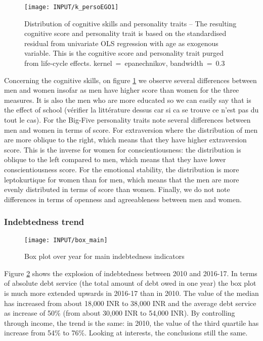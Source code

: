 \documentclass[a4paper, 11pt, onecolumn]{article}
\begin{document}
\begin{figure}[ht]
\raggedright
\texttt{[image: INPUT/k\_persoEGO1]}
\caption{Distribution of cognitive skills and personality traits -- The resulting cognitive score and personality trait is based on the standardised residual from univariate OLS regression with age as exogenous variable. This is the cognitive score and personality trait purged from life-cycle effects. kernel~=~epanechnikov, bandwidth~=~0.3}
\label{figure:EGOscore}
\end{figure}
Concerning the cognitive skills, on figure \ref{figure:EGOscore} we observe several differences between men and women insofar as men have higher score than women for the three measures.
It is also the men who are more educated so we can easily say that is the effect of school (vérifier la littérature dessus car si ca se trouve ce n'est pas du tout le cas).
For the Big-Five personality traits note several differences between men and women in terms of score.
For extraversion where the distribution of men are more oblique to the right, which means that they have higher extraversion score.
This is the inverse for women for conscientiousness: the distribution is oblique to the left compared to men, which means that they have lower conscientiousness score.
For the emotional stability, the distribution is more leptokurtique for women than for men, which means that the men are more evenly distributed in terms of score than women.
Finally, we do not note differences in terms of openness and agreeableness between men and women.

		\subsubsection{Indebtedness trend}

\begin{figure}[ht]
\raggedright
\texttt{[image: INPUT/box\_main]}
\caption{Box plot over year for main indebtedness indicators}
\label{figure:debttrendmain}
\end{figure}
Figure \ref{figure:debttrendmain} shows the explosion of indebtedness between 2010 and 2016-17.
In terms of absolute debt service (the total amount of debt owed in one year) the box plot is much more extended upwards in 2016-17 than in 2010.
The value of the median has increased from about 18,000 INR to 38,000 INR and the average debt service as increase of 50\% (from about 30,000 INR to 54,000 INR).
By controlling through income, the trend is the same: in 2010, the value of the third quartile has increase from 54\% to 76\%.
Looking at interests, the conclusions still the same.
\end{document}
